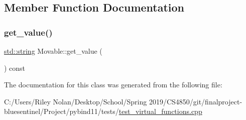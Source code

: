\subsection{Member Function Documentation}
\mbox{\label{class_movable_a1369a0903e539801e447c9335ff0523b}} 
\subsubsection{\texorpdfstring{get\_value()}{get\_value()}}
{\footnotesize\ttfamily \mbox{\hyperlink{_s_d_l__opengl__glext_8h_ab4ccfaa8ab0e1afaae94dc96ef52dde1}{std\+::string}} Movable\+::get\+\_\+value (\begin{DoxyParamCaption}{ }\end{DoxyParamCaption}) const\hspace{0.3cm}{\ttfamily [inline]}}



The documentation for this class was generated from the following file\+:\begin{DoxyCompactItemize}
\item 
C\+:/\+Users/\+Riley Nolan/\+Desktop/\+School/\+Spring 2019/\+C\+S4850/git/finalproject-\/bluesentinel/\+Project/pybind11/tests/\mbox{\hyperlink{test__virtual__functions_8cpp}{test\+\_\+virtual\+\_\+functions.\+cpp}}\end{DoxyCompactItemize}
